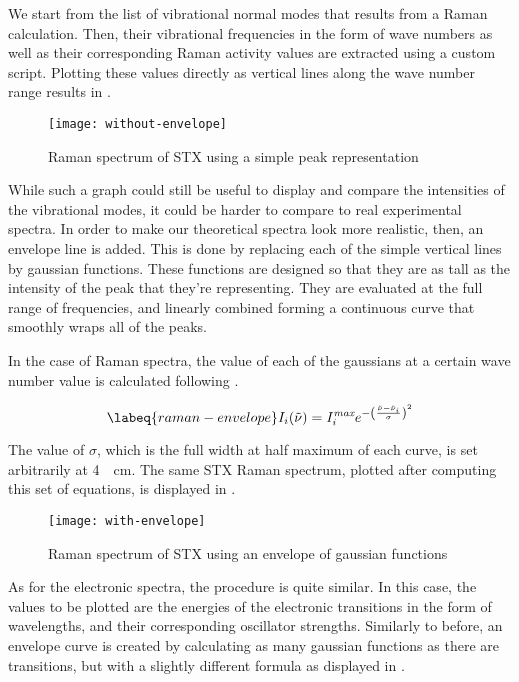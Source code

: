 We start from the list of vibrational normal modes that results from a Raman calculation.
Then, their vibrational frequencies in the form of wave numbers as well as their corresponding Raman activity values are extracted using a custom script.
Plotting these values directly as vertical lines along the wave number range results in .

\begin{figure}
    \centering
    \texttt{[image: without-envelope]}
    \caption[Raman spectrum as simple peaks]{Raman spectrum of STX using a simple peak representation}
\end{figure}

While such a graph could still be useful to display and compare the intensities of the vibrational modes, it could be harder to compare to real experimental spectra.
In order to make our theoretical spectra look more realistic, then, an envelope line is added.
This is done by replacing each of the simple vertical lines by gaussian functions.
These functions are designed so that they are as tall as the intensity of the peak that they're representing.
They are evaluated at the full range of frequencies, and linearly combined forming a continuous curve that smoothly wraps all of the peaks.

In the case of Raman spectra, the value of each of the gaussians at a certain wave number value is calculated following .

\begin{equation}
    \labeq{raman-envelope}
    I_i (\tilde{\nu}) = I_i^\textit{max}e^{-\left(\frac{\tilde{\nu} - \tilde{\nu}_i}{\sigma}\right)^2}
\end{equation}

The value of $\sigma$, which is the full width at half maximum of each curve, is set arbitrarily at \SI{4}{\per\cm}.
The same STX Raman spectrum, plotted after computing this set of equations, is displayed in .

\begin{figure}
    \centering
    \texttt{[image: with-envelope]}
    \caption[Raman spectrum with gaussian envelope]{Raman spectrum of STX using an envelope of gaussian functions}
\end{figure}

As for the electronic spectra, the procedure is quite similar.
In this case, the values to be plotted are the energies of the electronic transitions in the form of wavelengths, and their corresponding oscillator strengths.
Similarly to before, an envelope curve is created by calculating as many gaussian functions as there are transitions, but with a slightly different formula as displayed in .

